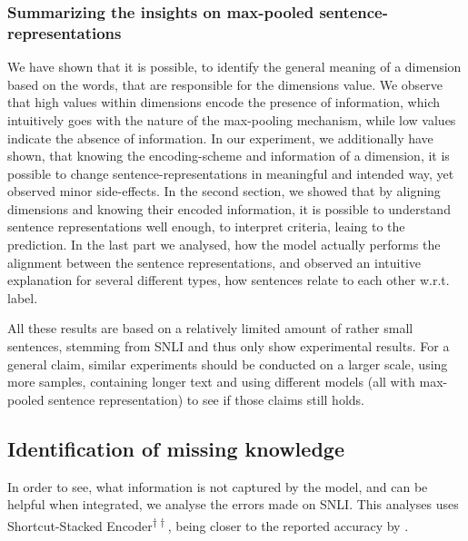 \subsubsection{Summarizing the insights on max-pooled sentence-representations}
We have shown that it is possible, to identify the general meaning of a dimension based on the words, that are responsible for the dimensions value. We observe that high values within dimensions encode the presence of information, which intuitively goes with the nature of the max-pooling mechanism, while low values indicate the absence of information. In our experiment, we additionally have shown, that knowing the encoding-scheme and information of a dimension, it is possible to change sentence-representations in meaningful and intended way, yet observed minor side-effects. In the second section, we showed that by aligning dimensions and knowing their encoded information, it is possible to understand sentence representations well enough, to interpret criteria, leaing to the prediction. In the last part we analysed, how the model actually performs the alignment between the sentence representations, and observed an intuitive explanation for several different types, how sentences relate to each other w.r.t. label.
\newline

\noindent
All these results are based on a relatively limited amount of rather small sentences, stemming from \ac{SNLI} and thus only show experimental results. For a general claim, similar experiments should be conducted on a larger scale, using more samples, containing longer text and using different models (all with max-pooled sentence representation) to see if those claims still holds. 
\subsection{Identification of missing knowledge}
In order to see, what information is not captured by the model, and can be helpful when integrated, we analyse the errors made on \ac{SNLI}. This analyses uses Shortcut-Stacked Encoder\textsuperscript{$\dagger\dagger$}, being closer to the reported accuracy by \cite{nie2017shortcut}. 
